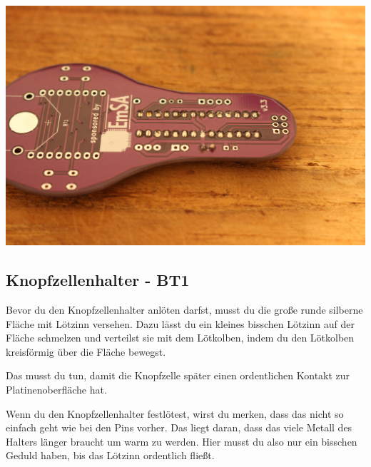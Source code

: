 \documentclass{article}
\begin{document}
\begin{minipage}[b]{0.5\textwidth}
	\includegraphics[width=\textwidth]{Bilder2024/IMG_0046.JPG}
\end{minipage}

\subsection{Knopfzellenhalter - BT1}

Bevor du den Knopfzellenhalter anlöten darfst, musst du die große runde silberne Fläche mit Lötzinn versehen. Dazu lässt du ein kleines bisschen Lötzinn auf der Fläche schmelzen und verteilst sie mit dem Lötkolben, indem du den Lötkolben kreisförmig über die Fläche bewegst.

Das musst du tun, damit die Knopfzelle später einen ordentlichen Kontakt zur Platinenoberfläche hat.

Wenn du den Knopfzellenhalter festlötest, wirst du merken, dass das nicht so einfach geht wie bei den Pins vorher. Das liegt daran, dass das viele Metall des Halters länger braucht um warm zu werden. Hier musst du also nur ein bisschen Geduld haben, bis das Lötzinn ordentlich fließt.

\vspace{1cm}
\end{document}
